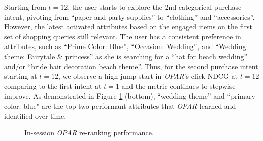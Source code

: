 \documentclass[11pt, dvipdfmx]{article}
\begin{document}
Starting from $t=12$, the user starts to explore the 2nd categorical purchase intent, pivoting from ``paper and party supplies'' to ``clothing'' and ``accessories''. However, the latest activated attributes based on the engaged items on the first set of shopping queries still relevant. The user has a consistent preference in attributes, such as ``Prime Color: Blue'', ``Occasion: Wedding'', and ``Wedding theme: Fairytale $\&$ princess'' as she is searching for a ``hat for beach wedding'' and/or ``bride hair decoration beach theme''. Thus, for the second purchase intent starting at $t=12$, we observe a high jump start in \textit{OPAR}'s click NDCG at $t=12$ comparing to the first intent at $t=1$ and the metric continues to stepwise improve. As demonstrated in Figure \ref{fig:multiIntent} (bottom), ``wedding theme'' and ``primary color: blue" are the top two performant attributes that \emph{OPAR} learned and identified over time. 


\begin{figure}[ht]
\centering
{}
\qquad
{}
\caption{In-session \textit{OPAR} re-ranking performance.}
\label{fig:multiIntent}
\end{figure}
\end{document}
